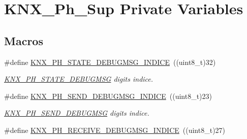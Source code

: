 \hypertarget{group___k_n_x___p_h___sup___private___variables}{}\section{K\+N\+X\+\_\+\+Ph\+\_\+\+Sup Private Variables}
\label{group___k_n_x___p_h___sup___private___variables}
\subsection*{Macros}
\begin{DoxyCompactItemize}
\item 
\#define \hyperlink{group___k_n_x___p_h___sup___private___variables_ga4337350e8fd2ce76fcfc8a820acff39e}{K\+N\+X\+\_\+\+P\+H\+\_\+\+S\+T\+A\+T\+E\+\_\+\+D\+E\+B\+U\+G\+M\+S\+G\+\_\+\+I\+N\+D\+I\+CE}~((uint8\+\_\+t)32)\hypertarget{group___k_n_x___p_h___sup___private___variables_ga4337350e8fd2ce76fcfc8a820acff39e}{}\label{group___k_n_x___p_h___sup___private___variables_ga4337350e8fd2ce76fcfc8a820acff39e}

\begin{DoxyCompactList}\small\item\em \hyperlink{group___k_n_x___p_h___sup___private___variables_gaa18f29dc3cf5b41ce81bcf264601d400}{K\+N\+X\+\_\+\+P\+H\+\_\+\+S\+T\+A\+T\+E\+\_\+\+D\+E\+B\+U\+G\+M\+SG} digits indice. \end{DoxyCompactList}\item 
\#define \hyperlink{group___k_n_x___p_h___sup___private___variables_gad1f9e6675f34456d40cf7c08b9bd305f}{K\+N\+X\+\_\+\+P\+H\+\_\+\+S\+E\+N\+D\+\_\+\+D\+E\+B\+U\+G\+M\+S\+G\+\_\+\+I\+N\+D\+I\+CE}~((uint8\+\_\+t)23)\hypertarget{group___k_n_x___p_h___sup___private___variables_gad1f9e6675f34456d40cf7c08b9bd305f}{}\label{group___k_n_x___p_h___sup___private___variables_gad1f9e6675f34456d40cf7c08b9bd305f}

\begin{DoxyCompactList}\small\item\em \hyperlink{group___k_n_x___p_h___sup___private___variables_ga16f43b8d36bcc39b90564fac102ac721}{K\+N\+X\+\_\+\+P\+H\+\_\+\+S\+E\+N\+D\+\_\+\+D\+E\+B\+U\+G\+M\+SG} digits indice. \end{DoxyCompactList}\item 
\#define \hyperlink{group___k_n_x___p_h___sup___private___variables_gacc017b9a5b70a1082a3713dbc43ac62c}{K\+N\+X\+\_\+\+P\+H\+\_\+\+R\+E\+C\+E\+I\+V\+E\+\_\+\+D\+E\+B\+U\+G\+M\+S\+G\+\_\+\+I\+N\+D\+I\+CE}~((uint8\+\_\+t)27)\hypertarget{group___k_n_x___p_h___sup___private___variables_gacc017b9a5b70a1082a3713dbc43ac62c}{}\label{group___k_n_x___p_h___sup___private___variables_gacc017b9a5b70a1082a3713dbc43ac62c}


\end{DoxyCompactItemize}
